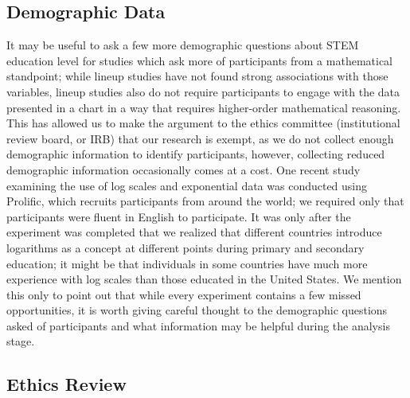 \documentclass[
  10pt,
]{article}
\begin{document}
\subsection{Demographic Data}\label{demographic-data}

It may be useful to ask a few more demographic questions about STEM
education level for studies which ask more of participants from a
mathematical standpoint; while lineup studies have not found strong
associations with those variables, lineup studies also do not require
participants to engage with the data presented in a chart in a way that
requires higher-order mathematical reasoning. This has allowed us to
make the argument to the ethics committee (institutional review board,
or IRB) that our research is exempt, as we do not collect enough
demographic information to identify participants, however, collecting
reduced demographic information occasionally comes at a cost. One recent
study examining the use of log scales and exponential data was conducted
using Prolific, which recruits participants from around the world; we
required only that participants were fluent in English to participate.
It was only after the experiment was completed that we realized that
different countries introduce logarithms as a concept at different
points during primary and secondary education; it might be that
individuals in some countries have much more experience with log scales
than those educated in the United States. We mention this only to point
out that while every experiment contains a few missed opportunities, it
is worth giving careful thought to the demographic questions asked of
participants and what information may be helpful during the analysis
stage.

\subsection{Ethics Review}\label{ethics-review}
\end{document}
